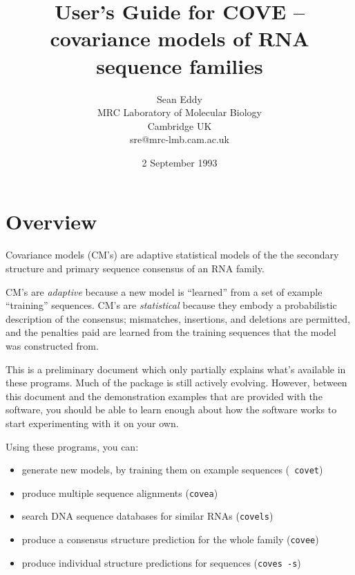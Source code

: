 
\title{User's Guide for COVE -- covariance models of RNA sequence
families }
\author{Sean Eddy\\MRC Laboratory of Molecular Biology\\Cambridge UK\\sre@mrc-lmb.cam.ac.uk}
\date {2 September 1993}



\maketitle

\section {Overview}

Covariance models (CM's) are adaptive statistical models of the the
secondary structure and primary sequence consensus of an RNA family.

CM's are {\em adaptive} because a new model is ``learned'' from a set
of example ``training'' sequences.  CM's are {\em statistical} because
they embody a probabilistic description of the consensus; mismatches,
insertions, and deletions are permitted, and the penalties paid are
learned from the training sequences that the model was constructed
from.

This is a preliminary document which only partially explains what's
available in these programs. Much of the package is still actively
evolving. However, between this document and the demonstration
examples that are provided with the software, you should be able to
learn enough about how the software works to start experimenting with
it on your own.

Using these programs, you can:
\begin{itemize}
\item generate new models, by training them on example sequences ({\tt
      covet}) 
\item produce multiple sequence alignments ({\tt covea})
\item search DNA sequence databases for similar RNAs ({\tt covels})
\item produce a consensus structure prediction for the whole family
      ({\tt covee})
\item produce individual structure predictions for sequences ({\tt coves -s})
\end{itemize}

